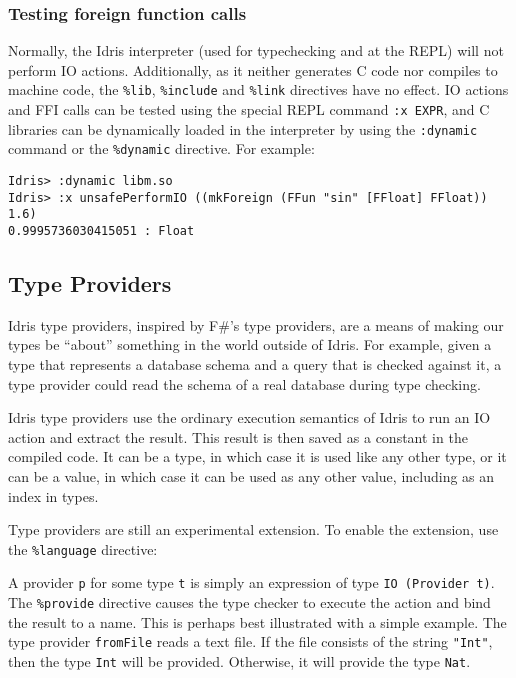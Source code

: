 \subsubsection*{Testing foreign function calls}
Normally, the Idris interpreter (used for typechecking and at the REPL) will
not perform IO actions.  Additionally, as it neither generates C code nor
compiles to machine code, the \texttt{\%lib}, \texttt{\%include} and
\texttt{\%link} directives have no effect. IO actions and FFI calls can be
tested using the special REPL command \texttt{:x EXPR}, and C libraries can be
dynamically loaded in the interpreter by using the \texttt{:dynamic} command
or the \texttt{\%dynamic} directive. For example:

\begin{lstlisting}
Idris> :dynamic libm.so
Idris> :x unsafePerformIO ((mkForeign (FFun "sin" [FFloat] FFloat)) 1.6)
0.9995736030415051 : Float
\end{lstlisting}

\subsection{Type Providers}
Idris type providers, inspired by F\#'s type providers, are a means of making
our types be ``about'' something in the world outside of Idris. For example,
given a type that represents a database schema and a query that is checked
against it, a type provider could read the schema of a real database during
type checking.

Idris type providers use the ordinary execution semantics of Idris to run an
IO action and extract the result. This result is then saved as a constant in
the compiled code. It can be a type, in which case it is used like any other
type, or it can be a value, in which case it can be used as any other value,
including as an index in types.

Type providers are still an experimental extension. To enable the extension,
use the \texttt{\%language} directive:

\begin{code}
\end{code}

A provider \texttt{p} for some type \texttt{t} is simply an expression of type
\texttt{IO (Provider t)}. The \texttt{\%provide} directive causes the type
checker to execute the action and bind the result to a name.  This is perhaps
best illustrated with a simple example. The type provider \texttt{fromFile}
reads a text file. If the file consists of the string \texttt{"Int"}, then the
type \texttt{Int} will be provided. Otherwise, it will provide the type
\texttt{Nat}.


